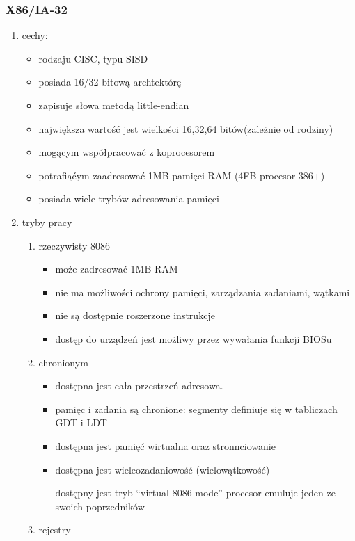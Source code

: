 \documentclass[11pt]{article}
\begin{document}
\subsubsection{X86/IA-32}
\label{sec:orgbedf7cf}
\begin{enumerate}
\item cechy:
\label{sec:orgb338cb5}
\begin{itemize}
\item rodzaju CISC, typu SISD
\item posiada 16/32 bitową archtektórę
\item zapisuje słowa metodą little-endian
\item największa wartość jest wielkości 16,32,64 bitów(zależnie od rodziny)
\item mogącym współpracować z koprocesorem
\item potrafiąćym zaadresować 1MB pamięci RAM (4FB procesor 386+)
\item posiada wiele trybów adresowania pamięci
\end{itemize}
\item tryby pracy
\label{sec:org8e1a9b5}
\begin{enumerate}
\item rzeczywisty 8086
\label{sec:org3d8cf58}
\begin{itemize}
\item może zadresować 1MB RAM
\item nie ma możliwości ochrony pamięci, zarządzania zadaniami, wątkami
\item nie są dostępnie roszerzone instrukcje
\item dostęp do urządzeń jest możliwy przez wywałania funkcji BIOSu
\end{itemize}
\item chronionym
\label{sec:org5ae809d}
\begin{itemize}
\item dostępna jest cała przestrzeń adresowa.
\item pamięc i zadania są chronione: segmenty definiuje się w tabliczach GDT i LDT
\item dostępna jest pamięć wirtualna oraz stronnciowanie
\item dostępna jest wieleozadaniowość (wielowątkowość)
\item[{dostępny jest tryb ``virtual 8086 mode''}] procesor emuluje jeden ze swoich poprzedników
\end{itemize}
\item rejestry
\label{sec:orgff45d9c}
\begin{enumerate}

\end{enumerate}
\end{enumerate}
\end{enumerate}
\end{document}
